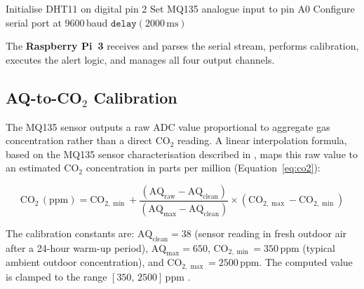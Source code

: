\begin{algorithm}[H]
\DontPrintSemicolon
\caption{Arduino UNO Sensor Acquisition Firmware}
\label{alg:arduino}
\BlankLine
{}
Initialise DHT11 on digital pin 2\;
Set MQ135 analogue input to pin A0\;
Configure serial port at 9600\,baud\;
$\texttt{delay}(2000\,\text{ms})$ 
\BlankLine
{}
\end{algorithm}

The \textbf{Raspberry Pi~3} receives and parses the serial stream,
performs calibration, executes the alert logic, and manages all four
output channels.

\subsection{AQ-to-CO$_2$ Calibration}

The MQ135 sensor outputs a raw ADC value proportional to aggregate
gas concentration rather than a direct CO$_2$ reading. A linear
interpolation formula, based on the MQ135 sensor characterisation
described in \cite{r50,r1,r2}, maps this raw value to an estimated
CO$_2$ concentration in parts per million (Equation~\eqref{eq:co2}):

\begin{equation}
  \text{CO}_2\,(\text{ppm}) = \text{CO}_{2,\min}
  + \frac{(\text{AQ}_\text{raw} - \text{AQ}_\text{clean})}
         {(\text{AQ}_\text{max} - \text{AQ}_\text{clean})}
  \times (\text{CO}_{2,\max} - \text{CO}_{2,\min})
  \label{eq:co2}
\end{equation}

The calibration constants are: $\text{AQ}_\text{clean} = 38$ (sensor
reading in fresh outdoor air after a 24-hour warm-up period),
$\text{AQ}_\text{max} = 650$, $\text{CO}_{2,\min} = 350\,\text{ppm}$
(typical ambient outdoor concentration), and
$\text{CO}_{2,\max} = 2500\,\text{ppm}$. The computed value is clamped
to the range $[350,\,2500]$\,ppm \cite{r50,r1,r2}.

